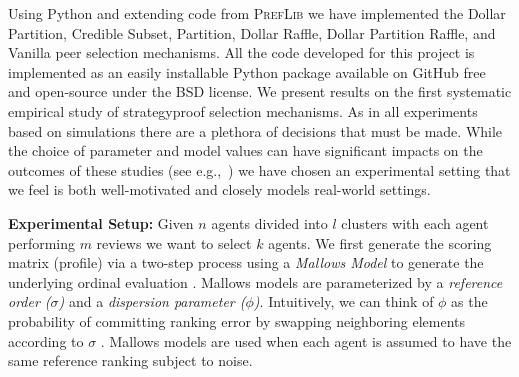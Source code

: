 \documentclass[letterpaper]{article}
\begin{document}
Using Python and extending code from \textsc{PrefLib} \cite{MaWa13a} we have implemented the Dollar Partition, Credible Subset, Partition, Dollar Raffle, Dollar Partition Raffle, and Vanilla peer selection mechanisms. All the code developed for this project is implemented as an easily installable Python package available on GitHub free and open-source under the BSD license. 
We present results on the first systematic empirical study of strategyproof selection mechanisms. As in all experiments based on simulations there are a plethora of decisions that must be made.
While the choice of parameter and model values can have significant impacts on the outcomes of these studies (see e.g.,~\cite{PRM13a}) we have chosen an experimental setting that we feel is both well-motivated and closely models real-world settings. 

\smallskip
\noindent
\textbf{Experimental Setup:}
Given $n$ agents divided into $l$ clusters with each agent performing $m$ reviews we want to select $k$ agents. We first generate the scoring matrix (profile) via a two-step process 
using a \emph{Mallows Model} to generate the underlying ordinal evaluation \cite{Mall57a}. Mallows models are parameterized by a \emph{reference order ($\sigma$)} and a \emph{dispersion parameter ($\phi$)}. 
Intuitively, we can think of $\phi$ as the probability of committing ranking error by swapping neighboring elements according to $\sigma$ \cite{LuBo11a}. %
Mallows models are used when each agent is assumed to have the same reference ranking subject to noise. 
\end{document}
